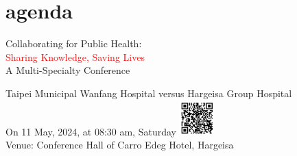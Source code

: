 \section{agenda}

\begin{center} %
    
\begin{tikzfigure}[]

\vspace{2cm}

\hspace{2cm}
%

\end{tikzfigure}

\end{center}


\fontsize{20}{24}  Collaborating for Public Health: \\
\textcolor{red}{Sharing Knowledge, Saving Lives} \\
A Multi-Specialty Conference \\
 \par
\vspace{0.3cm}

\fontsize{12}{13} \sc
Taipei Municipal Wanfang Hospital versus Hargeisa Group Hospital\\
On 11 May, 2024, at 08:30 am, Saturday \includegraphics[width=0.10\textwidth]{QRcode_2024MSC.png} \\
Venue: Conference Hall of Carro Edeg Hotel, Hargeisa
\par





